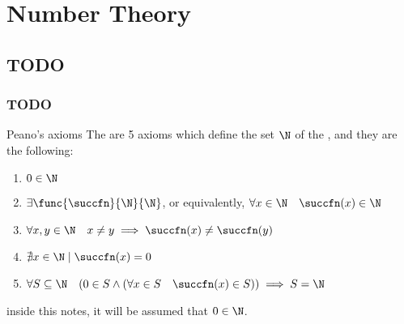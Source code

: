 \documentclass[a4paper, 12pt]{report}
\institute{\curlyquotes{\hspace{0.25mm}Sapienza} Università di Roma}
\subtitle{Appunti integrati con il libro \book}
\author{\textit{Autore}\\\authorName}
\institute{\curlyquotes{\hspace{0.25mm}Sapienza} University of Rome}
\subtitle{Lecture notes integrated with the book \book}
\author{\textit{Author}\\\authorName}
\title{\courseName}
\date{\today}
\begin{document}
    \maketitle

    {
        \hypersetup{allcolors=black}

        \romantableofcontents
    }

    \introduction


    \chapter{Number Theory}
    
    \section{TODO}
    
    \subsection{TODO}

    \begin{frameddefn}{Peano's axioms}
        The  are 5 axioms which define the set $\N$ of the , and they are the following:

        \begin{enumerate}[label=\roman*), font=\itshape]
            \item $0 \in \N$
            \item $\exists \func{\succfn}{\N}{\N}$, or equivalently, $\forall x \in \N \quad \succfn(x) \in \N$
            \item $\forall x, y \in \N \quad x \neq y \implies \succfn(x) \neq \succfn(y)$
            \item $\nexists x \in \N \mid \succfn(x) = 0$
            \item $\forall S \subseteq \N \quad (0 \in S \land (\forall x \in S \quad \succfn(x) \in S)) \implies S = \N$
        \end{enumerate}

         inside this notes, it will be assumed that $0 \in \N$.
    \end{frameddefn}
\end{document}
